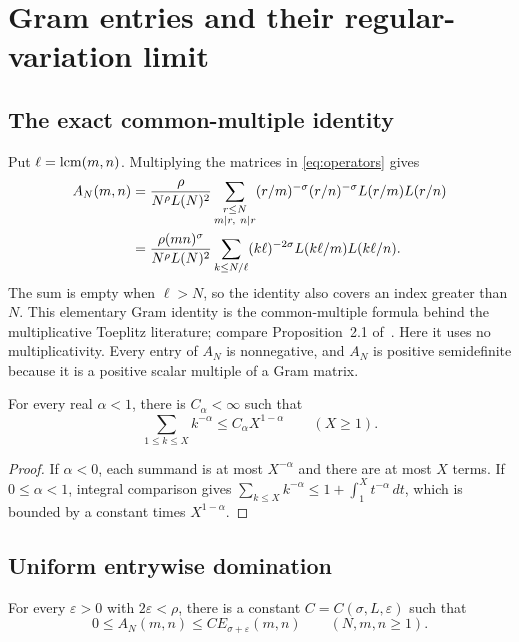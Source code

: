 \section{Gram entries and their regular-variation limit}
\label{sec:gram}

\subsection{The exact common-multiple identity}

Put $\ell=\operatorname{lcm}(m,n)$. Multiplying the matrices in
\eqref{eq:operators} gives
\begin{align}
 A_N(m,n)
 &=\frac{\rho}{N^\rho L(N)^2}
   \sum_{\substack{r\le N\\m\mid r,\ n\mid r}}
   (r/m)^{-\sigma}(r/n)^{-\sigma}L(r/m)L(r/n)\notag\\
 &=\frac{\rho(mn)^\sigma}{N^\rho L(N)^2}
   \sum_{k\le N/\ell}(k\ell)^{-2\sigma}
       L(k\ell/m)L(k\ell/n).
 \label{eq:gram}
\end{align}
The sum is empty when $\ell>N$, so the identity also covers an
index greater than $N$. This elementary Gram identity is the
common-multiple formula behind the multiplicative Toeplitz literature;
compare Proposition~2.1 of~\cite{Hilberdink2017}.
Here it uses no multiplicativity. Every entry of $A_N$ is nonnegative,
and $A_N$ is positive semidefinite because it is a positive scalar
multiple of a Gram matrix.

\begin{lemma}
\label{lem:powers}
For every real $\alpha<1$, there is $C_\alpha<\infty$ such that
\begin{equation}
 \sum_{1\le k\le X}k^{-\alpha}\le C_\alpha X^{1-\alpha}
 \qquad(X\ge1).
 \label{eq:powers}
\end{equation}
\end{lemma}

\begin{proof}
If $\alpha<0$, each summand is at most $X^{-\alpha}$ and there
are at most $X$ terms. If $0\le\alpha<1$, integral comparison
gives $\sum_{k\le X}k^{-\alpha}\le1+\int_1^X t^{-\alpha}\,dt$,
which is bounded by a constant times $X^{1-\alpha}$.
\end{proof}

\subsection{Uniform entrywise domination}

\begin{proposition}
\label{prop:entry-bound}
For every $\varepsilon>0$ with $2\varepsilon<\rho$, there is a
constant $C=C(\sigma,L,\varepsilon)$ such that
\begin{equation}
 0\le A_N(m,n)\le C E_{\sigma+\varepsilon}(m,n)
 \qquad(N,m,n\ge1).
 \label{eq:entry-bound}
\end{equation}
\end{proposition}

